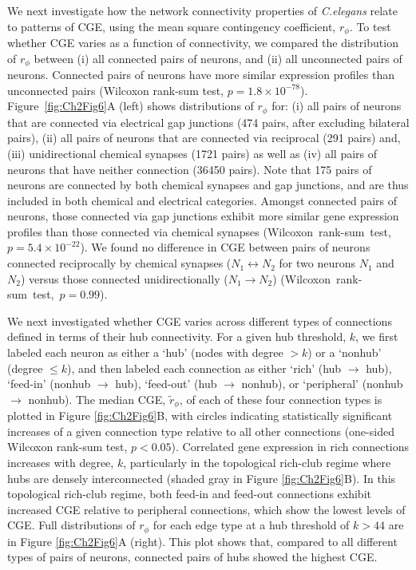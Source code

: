 We next investigate how the network connectivity properties of \emph{C.elegans} relate to patterns of CGE, using the mean square contingency coefficient, $r_\phi$.
To test whether CGE varies as a function of connectivity, we compared the distribution of $r_\phi$ between
(i) all connected pairs of neurons, and
(ii) all unconnected pairs of neurons.
Connected pairs of neurons have more similar expression profiles than unconnected pairs (Wilcoxon rank-sum test, $p = 1.8 \times 10^{-78}$).
Figure~\ref{fig:Ch2Fig6}A (left) shows distributions of $r_\phi$ for:
(i) all pairs of neurons that are connected via electrical gap junctions (474 pairs, after excluding bilateral pairs),
(ii) all pairs of neurons that are connected via reciprocal (291 pairs) and,
(iii) unidirectional chemical synapses (1721 pairs) as well as
(iv) all pairs of neurons that have neither connection (\num{36450} pairs).
Note that 175 pairs of neurons are connected by both chemical synapses and gap junctions, and are thus included in both chemical and electrical categories.
Amongst connected pairs of neurons, those connected via gap junctions exhibit more similar gene expression profiles than those connected via chemical synapses (\mbox{Wilcoxon rank-sum test, $p = 5.4 \times 10^{-22}$}).
We found no difference in CGE between pairs of neurons connected reciprocally by chemical synapses ($N_1 \leftrightarrow N_2$ for two neurons $N_1$ and $N_2$) versus those connected unidirectionally ($N_1 \rightarrow N_2$) \mbox{(Wilcoxon rank-sum test, $p = 0.99$)}.

We next investigated whether CGE varies across different types of connections defined in terms of their hub connectivity.
For a given hub threshold, $k$, we first labeled each neuron as either a `hub' (nodes with degree $> k$) or a `nonhub' (degree $\leq k$), and then labeled each connection as either `rich' (hub $\rightarrow$ hub), `feed-in' (nonhub $\rightarrow$ hub), `feed-out' (hub $\rightarrow$ nonhub), or `peripheral' (nonhub $\rightarrow$ nonhub).
The median CGE, $\tilde{r}_\phi$, of each of these four connection types is plotted in Figure \ref{fig:Ch2Fig6}B, with circles indicating statistically significant increases of a given connection type relative to all other connections (one-sided Wilcoxon rank-sum test, $p < 0.05$).
Correlated gene expression in rich connections increases with degree, $k$, particularly in the topological rich-club regime where hubs are densely interconnected (shaded gray in Figure \ref{fig:Ch2Fig6}B).
In this topological rich-club regime, both feed-in and feed-out connections exhibit increased CGE relative to peripheral connections, which show the lowest levels of CGE.
Full distributions of $r_\phi$ for each edge type at a hub threshold of $k > 44$ are in Figure \ref{fig:Ch2Fig6}A (right).
This plot shows that, compared to all different types of pairs of neurons, connected pairs of hubs showed the highest CGE.

